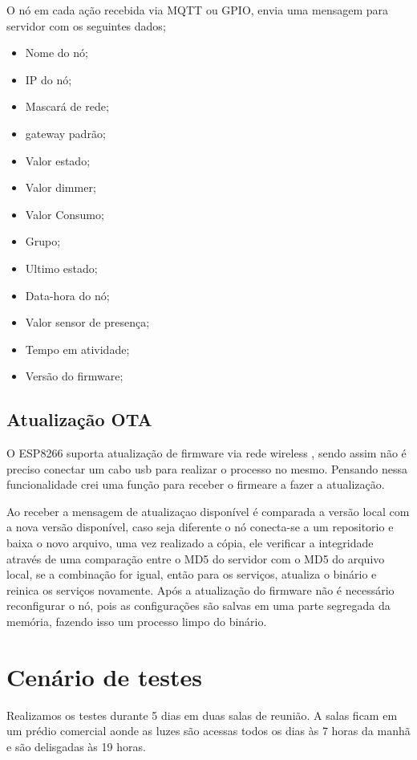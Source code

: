 \documentclass[openright]{normas-utf-tex} %
\begin{document}
O nó em cada ação recebida via MQTT ou GPIO,  envia uma mensagem para servidor com os seguintes dados;

\begin{itemize}
    \item Nome do nó;
    \item IP do nó;
    \item Mascará de rede;
    \item gateway padrão;
    \item Valor estado;
    \item Valor dimmer;
    \item Valor Consumo;
    \item Grupo;
    \item Ultimo estado;
    \item Data-hora do nó;
    \item Valor sensor de presença;
    \item Tempo em atividade;
    \item Versão do firmware;
\end{itemize}

\subsection{Atualização OTA}

O ESP8266 suporta atualização de firmware via rede wireless  \cite{espressif}, sendo assim não é preciso conectar um cabo usb para realizar o processo no mesmo. 
Pensando nessa funcionalidade crei uma função para receber o firmeare a fazer a atualização.

Ao receber a mensagem de atualizaçao disponível é comparada a versão local com a nova versão disponível, caso seja diferente o nó conecta-se a um repositorio e baixa o novo arquivo, uma vez realizado a cópia, ele verificar a integridade através de uma comparação entre o MD5 do servidor com o MD5 do arquivo local, se a combinação for igual, então para os serviços, atualiza o binário e reinica os serviços novamente.
Após a atualização do firmware não é necessário reconfigurar o nó, pois as configurações são salvas em uma parte segregada da memória, fazendo isso um processo limpo do binário. 

\section{Cenário de testes}
Realizamos os testes durante 5 dias em duas salas de reunião. A salas ficam em um prédio comercial aonde as luzes são acessas todos os dias às 7 horas da manhã e são delisgadas às 19 horas.
\end{document}
